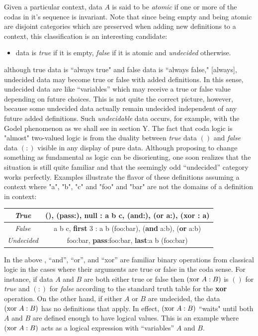 \documentclass[11pt]{article}
\begin{document}
     Given a particular context, data $A$ is said to be {\it atomic} if one or more of the codas in it's sequence is invariant.  Note that since being empty and being atomic 
are disjoint categories which are preserved when adding new definitions to a context, this classification is an interesting candidate: 
\begin{itemize}
\item data is {\it true} if it is empty, {\it false} if it is atomic and {\it undecided} otherwise. 
\end{itemize}
although true data is ``always true" and false data is ``always false," [always], undecided data may become true or false with added 
definitions.  In this sense, undecided data are like ``variables'' which may receive a true or false value depending on future choices.  
This is not quite the correct picture, however, because some undecided data actually remain undecided independent of any future added definitions.  
Such {\it undecidable} data occurs, for example, with the Godel phenomenon as we shall see in section Y.  
The fact that coda logic is "almost" two-valued logic is from the duality between {\it true} data $()$  and {\it false} data $(:)$ visible in any display of pure data.  
Although proposing to change something as fundamental as logic can be disorienting, one soon realizes that the situation is still quite familiar and that the 
seemingly odd ``undecided'' category works perfectly.  
Examples illustrate the flavor of these definitions assuming a context where "a", "b", "c" and "foo" and "bar" are not the domains of a definition in context: 
\begin{center}
\begin{tabular}{ | c | c | }
\hline
 {\it True} & (), ({\bf pass}:), {\bf null} : a b c, ({\bf and}:), ({\bf or} a:), ({\bf xor} : a)  \\ 
 \hline
 {\it False} & a b c, {\bf first} 3 : a b (foo:bar), ({\bf and} a:b), ({\bf or} a:b)  \\  
 \hline
 {\it Undecided} & foo:bar, {\bf pass}:foo:bar, {\bf last}:a b (foo:bar)  \\   
 \hline
\end{tabular}
\end{center}
In the above , ``and'', ``or'', and ``xor'' are familiar binary operations from classical logic in the cases where their arguments are true or false in the coda sense. 
For instance, if data $A$ and $B$ are both either true or false then $({\rm xor}\ A:B)$ is $()$ for {\it true} and $(:)$ for {\it false} according to the standard truth
 table for the {\bf xor} operation.  On the other hand, if either $A$ or $B$ are 
undecided, the data $({\rm xor}\ A:B)$ has no definitions that apply.  In effect, $({\rm xor}\ A:B)$ ``waits" until both $A$ and $B$ are defined enough to have logical values.   
This is an example where $({\rm xor}\ A:B)$ acts as a logical expression with ``variables'' $A$ and $B$. 
\end{document}

